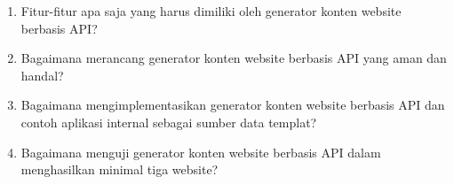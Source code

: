 \begin{enumerate}
    \item Fitur-fitur apa saja yang harus dimiliki oleh generator konten website berbasis API?
    
    \item Bagaimana merancang generator konten website berbasis API yang aman dan handal?
    
    \item Bagaimana mengimplementasikan generator konten website berbasis API dan contoh aplikasi internal sebagai sumber data templat?
    
    \item Bagaimana menguji generator konten website berbasis API dalam menghasilkan minimal tiga website?
    
\end{enumerate}